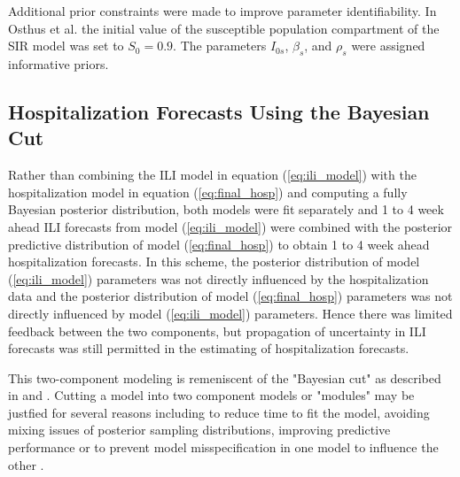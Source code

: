 
Additional prior constraints were made to improve parameter identifiability. 
In Osthus et al. \cite[]{osthus2019dynamic} the initial value of the 
susceptible population compartment of the SIR model was set to $S_0 = 0.9$. 
The parameters $I_{0s}$, $\beta_s$, and $\rho_s$ were assigned informative 
priors. 


\subsection{Hospitalization Forecasts Using the Bayesian Cut}

Rather than combining the ILI model in equation (\ref{eq:ili_model}) with the 
hospitalization model in equation (\ref{eq:final_hosp}) and computing a fully Bayesian
posterior distribution, both models were fit separately and 1 to 4 week ahead
ILI forecasts from model (\ref{eq:ili_model}) were combined with the posterior
predictive distribution of model (\ref{eq:final_hosp}) to obtain 1 to 4 week
ahead hospitalization forecasts. In this scheme, the posterior distribution of 
model (\ref{eq:ili_model}) parameters was not directly influenced by the 
hospitalization data and the posterior distribution of model 
(\ref{eq:final_hosp}) parameters was not directly influenced by model 
(\ref{eq:ili_model}) parameters. Hence there was limited feedback between the
two components, but propagation of uncertainty in ILI forecasts was still 
permitted in the estimating of hospitalization forecasts.

This two-component modeling is remeniscent of the "Bayesian cut" as 
described in \cite{plummer2015cuts} and \cite{nott2023bayesian}. Cutting a model
into two component models or "modules" may be justfied for several reasons
including to reduce time to fit the model, avoiding mixing issues of posterior
sampling distributions, improving predictive performance or to prevent
model misspecification in one model to influence the other 
\cite[]{nott2023bayesian, jacob2020unbiased, jacob2017better, plummer2015cuts}.

